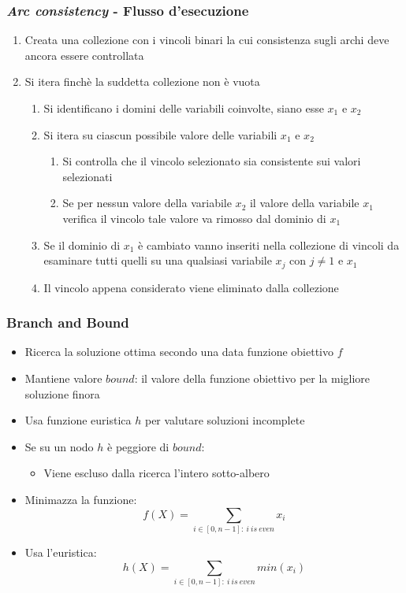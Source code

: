 \documentclass{beamer}
\begin{document}
\begin{frame}
\frametitle{\textit{Arc consistency} - Flusso d'esecuzione}

\begin{enumerate}
	\item Creata una collezione con i vincoli binari la cui consistenza sugli archi deve ancora essere controllata
	\item Si itera finchè la suddetta collezione non è vuota
	\begin{enumerate}
		\item Si identificano i domini delle variabili coinvolte, siano esse $x_1$ e $x_2$
		\item Si itera su ciascun possibile valore delle variabili $x_1$ e $x_2$
		\begin{enumerate}
			\item Si controlla che il vincolo selezionato sia consistente sui valori selezionati
			\item Se per nessun valore della variabile $x_2$ il valore della variabile $x_1$ verifica il vincolo tale valore va rimosso dal dominio di $x_1$
		\end{enumerate}
		\item Se il dominio di $x_1$ è cambiato vanno inseriti nella collezione di vincoli da esaminare tutti quelli su una qualsiasi variabile $x_j$ con $j\neq1$ e $x_1$
		\item Il vincolo appena considerato viene eliminato dalla collezione
	\end{enumerate}
\end{enumerate}

\end{frame}

\begin{frame}
\frametitle{Branch and Bound}

\begin{itemize}
	\item Ricerca la soluzione ottima secondo una data funzione obiettivo $f$
	\item Mantiene valore $bound$: il valore della funzione obiettivo per la migliore soluzione finora
	\item Usa funzione euristica $h$ per valutare soluzioni incomplete
	\item Se su un nodo $h$ è peggiore di $bound$:
	\begin{itemize}
		\item Viene escluso dalla ricerca l'intero sotto-albero
	\end{itemize}
	\item Minimazza la funzione:
\begin{equation*}
f(X) = \sum_{i \in [0,n-1]:~i~is~even} x_i
\end{equation*}
	\item Usa l'euristica:
\begin{equation*}
h(X) = \sum_{i \in [0,n-1]:~i~is~even} min(x_i)
\end{equation*}
\end{itemize}

\end{frame}
\end{document}
